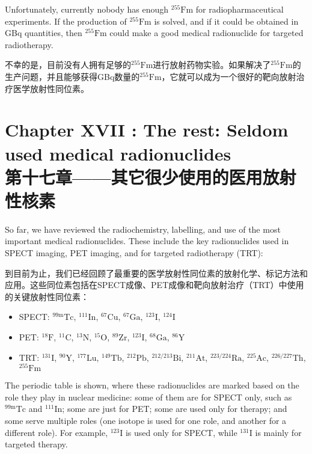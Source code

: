 \documentclass[dvipsnames, svgnames,a4paper,11pt]{article}
\begin{document}
Unfortunately, currently nobody has enough \(\mathrm{^{255}Fm}\) for radiopharmaceutical experiments. If the production of \(\mathrm{^{255}Fm}\) is solved, and if it could be obtained in GBq quantities, then \(\mathrm{^{255}Fm}\) could make a good medical radionuclide for targeted radiotherapy.

不幸的是，目前没有人拥有足够的\(\mathrm{^{255}Fm}\)进行放射药物实验。如果解决了\(\mathrm{^{255}Fm}\)的生产问题，并且能够获得GBq数量的\(\mathrm{^{255}Fm}\)，它就可以成为一个很好的靶向放射治疗医学放射性同位素。

\newpage


\section{Chapter XVII :  The rest: Seldom used medical radionuclides\\第十七章——其它很少使用的医用放射性核素}

So far, we have reviewed the radiochemistry, labelling, and use of the most important medical radionuclides. These include the key radionuclides used in SPECT imaging, PET imaging, and for targeted radiotherapy (TRT):

到目前为止，我们已经回顾了最重要的医学放射性同位素的放射化学、标记方法和应用。这些同位素包括在SPECT成像、PET成像和靶向放射治疗（TRT）中使用的关键放射性同位素：

\begin{itemize}
    \item SPECT: \(\mathrm{^{99m}Tc}\), \(\mathrm{^{111}In}\), \(\mathrm{^{67}Cu}\), \(\mathrm{^{67}Ga}\), \(\mathrm{^{123}I}\), \(\mathrm{^{124}I}\)
    \item PET: \(\mathrm{^{18}F}\), \(\mathrm{^{11}C}\), \(\mathrm{^{13}N}\), \(\mathrm{^{15}O}\), \(\mathrm{^{89}Zr}\), \(\mathrm{^{123}I}\), \(\mathrm{^{68}Ga}\), \(\mathrm{^{86}Y}\)
    \item TRT: \(\mathrm{^{131}I}\), \(\mathrm{^{90}Y}\), \(\mathrm{^{177}Lu}\), \(\mathrm{^{149}Tb}\), \(\mathrm{^{212}Pb}\), \(\mathrm{^{212/213}Bi}\), \(\mathrm{^{211}At}\), \(\mathrm{^{223/224}Ra}\), \(\mathrm{^{225}Ac}\), \(\mathrm{^{226/227}Th}\), \(\mathrm{^{255}Fm}\)
\end{itemize}

The periodic table is shown, where these radionuclides are marked based on the role they play in nuclear medicine: some of them are for SPECT only, such as \(\mathrm{^{99m}Tc}\) and \(\mathrm{^{111}In}\); some are just for PET; some are used only for therapy; and some serve multiple roles (one isotope is used for one role, and another for a different role). For example, \(\mathrm{^{123}I}\) is used only for SPECT, while \(\mathrm{^{131}I}\) is mainly for targeted therapy.
\end{document}
